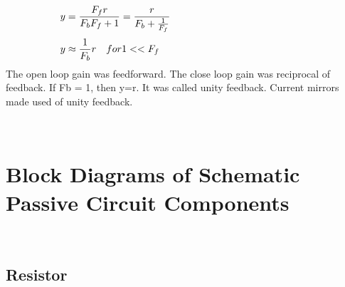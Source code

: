\documentclass[10pt,a4paper]{article}
\begin{document}
\begin{CJK*}{UTF8}{gbsn}
\begin{equation}
 \end{equation}
\begin{equation}
 \begin{minipage}{250pt}
                \begin{flushleft} $\displaystyle y = \frac{F_{f} r}{F_{b} F_{f} + 1} = \frac{r}{F_{b} + \frac{1}{F_{f}}}$  \end{flushleft}
 \end{minipage}
 \end{equation}
\begin{equation}
 \begin{minipage}{250pt}
                \begin{flushleft} $\displaystyle y \approx \frac{1}{F_b}r \quad for 1 << F_f$  \end{flushleft}
 \end{minipage}
 \end{equation}
\noindent The open loop gain was feedforward. The close loop gain was reciprocal of    feedback. If Fb = 1, then y=r. It was called unity feedback. Current mirrors    made used of unity feedback. 
 \par \ \par\noindent \section{Block Diagrams of Schematic Passive Circuit Components}
 \par \ \par\noindent \subsection{Resistor}
 \par \ \par\noindent \begin{figure}[H] \centering 


\end{figure}
\end{CJK*}
\end{document}
